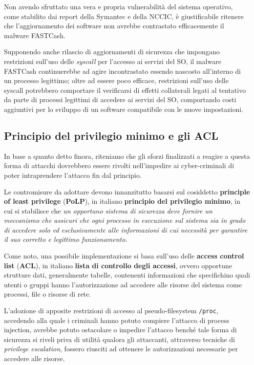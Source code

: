 \documentclass[10pt,a4paper, titlepage]{report}
\begin{document}
Non avendo sfruttato una vera e propria vulnerabilità del sistema operativo, come stabilito dai report della Symantec e della NCCIC, è giustificabile ritenere che l'aggiornamento dei software non avrebbe contrastato efficacemente il malware FASTCash. 

Supponendo anche rilascio di aggiornamenti di sicurezza che impongano restrizioni sull'uso delle \textit{syscall} per l'accesso ai servizi del SO, il malware FASTCash continuerebbe ad agire incontrastato essendo nascosto all'interno di un processo legittimo; oltre ad essere poco efficace, restrizioni sull'uso delle syscall potrebbero comportare il verificarsi di effetti collaterali legati al tentativo da parte di processi legittimi di accedere ai servizi del SO, comportando costi aggiuntivi per lo sviluppo di un software compatibile con le nuove impostazioni. 

\subsection{Principio del privilegio minimo e gli ACL}

In base a quanto detto finora, riteniamo che gli sforzi finalizzati a reagire a questa forma di attacchi dovrebbero essere rivolti nell'impedire ai cyber-criminali di poter intraprendere l'attacco fin dal principio. 

Le contromisure da adottare devono innanzitutto basarsi sul cosiddetto \textbf{principle of least privilege} (\textbf{PoLP}), in italiano \textbf{principio del privilegio minimo}, in cui si stabilisce che \textit{un opportuno sistema di sicurezza deve fornire un meccanismo che assicuri che ogni processo in esecuzione sul sistema sia in grado di accedere solo ed esclusivamente alle informazioni di cui necessità per garantire il suo corretto e legittimo funzionamento.}

Come noto, una possibile implementazione si basa sull'uso delle \textbf{access control list} (\textbf{ACL}), in italiano \textbf{lista di controllo degli accessi}, ovvero opportune strutture dati, generalmente tabelle, contenenti informazioni che specifichino quali utenti o gruppi hanno l'autorizzazione ad accedere alle risorse del sistema come processi, file o risorse di rete.

L'adozione di apposite restrizioni di accesso al pseudo-filesystem \texttt{/proc}, accedendo alla quale i criminali hanno potuto compiere l'attacco di process injection, avrebbe potuto ostacolare o impedire l'attacco benché tale forma di sicurezza si riveli priva di utilità qualora gli attaccanti, attraverso tecniche di \textit{privilege escalation}, fossero riusciti ad ottenere le autorizzazioni necessarie per accedere alle risorse.
\end{document}

